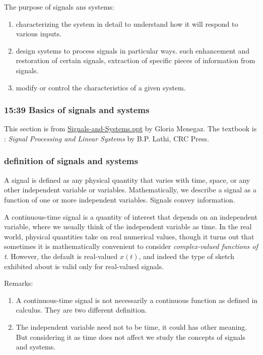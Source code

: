 \documentclass[koma,utopia,letterpaper,captions=tableheading,11pt,listings-sv,microtype,paralist,colorlinks=true,urlcolor=blue]{org-article}
\begin{document}
The purpose of signals ans systems:
\begin{enumerate}
\item characterizing the system in detail to understand how it will respond to
various inputs.
\item design systems to process signals in particular ways. such enhancement and
restoration of certain signals, extraction of specific pieces of information
from signals.
\item modify or control the characteristics of a given system.
\end{enumerate}


\subsubsection{15:39 Basics of signals and systems}
\label{sec:orgf198687}


This section is from \href{http://www.di.univr.it/documenti/OccorrenzaIns/matdid/matdid744681.pdf}{Signals-and-Systems.ppt}  by Gloria Menegaz. The textbook
is : \emph{Signal Processing and Linear Systems} by B.P. Lathi, CRC Press.

\subsubsection{definition of signals and systems}
\label{sec:org9f44052}


A signal is defined as any physical quantity that varies with time, space, or
any other independent variable or variables. Mathematically, we describe a
signal as a function of one or more independent variables. Signals convey
information.

A continuous-time signal is a quantity of interest that
depends on an independent variable, where we usually think of the independent
variable as time. In the real world, physical quantities take on real numerical
values, though it turns out that sometimes it is mathematically convenient to
consider \emph{complex-valued functions of t}. However, the default is real-valued
\(x(t)\), and indeed the type of sketch exhibited about is valid only for
real-valued signals.

Remarks:
\begin{enumerate}
\item A continuous-time signal is not necessarily a continuous function as defined
in calculus. They are two different definition.
\item The independent variable need not to be time, it could has other meaning. But
considering it as time does not affect we study the concepts of signals and
systems.
\end{enumerate}
\end{document}
